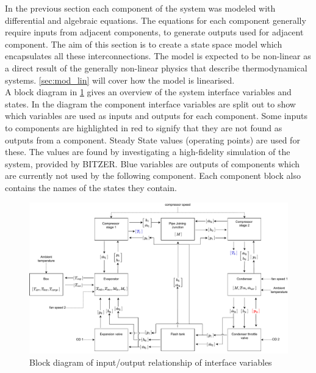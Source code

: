 
In the previous section each component of the system was modeled with differential and algebraic equations. The equations for each component generally require inputs from adjacent components, to generate outputs used for adjacent component. The aim of this section is to create a state space model which encapsulates all these interconnections. The model is expected to be non-linear as a direct result of the generally non-linear physics that describe thermodynamical systems. \cref{sec:mod_lin} will cover how the model is linearised.\\

A block diagram in \cref{fig:Block_diagram_inout} gives an overview of the system interface variables and states. In the diagram the component interface variables are split out to show which variables are used as inputs and outputs for each component. Some inputs to components are highlighted in red to signify that they are not found as outputs from a component. Steady State values (operating points) are used for these. The values are found by investigating a high-fidelity simulation of the system, provided by BITZER. Blue variables are outputs of components which are currently not used by the following component. Each component block also contains the names of the states they contain.

\begin{figure}[h!]
	\centering
	\includegraphics[width=1\textwidth]{Graphics/Block_Diagram_inout.pdf}
	\caption{Block diagram of input/output relationship of interface variables}
	\label{fig:Block_diagram_inout}
\end{figure}


